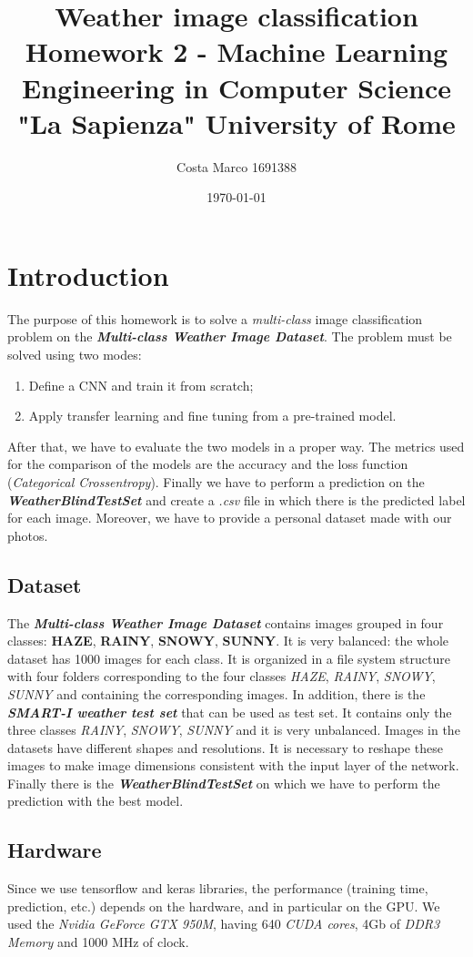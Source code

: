 \documentclass[11pt]{article}
\title{\textbf{Weather image classification} \\ \bigskip \large Homework 2 - Machine Learning \\ Engineering in Computer Science \\ "La Sapienza" University of Rome}
\author{Costa Marco 1691388}
\date{\today}
\begin{document}
\maketitle
\pagebreak
\tableofcontents
\pagebreak

\section{Introduction}
The purpose of this homework is to solve a \textit{multi-class} image classification problem on the \textbf{\textit{Multi-class Weather Image Dataset}}. The problem must be solved using two modes:
\begin{enumerate}
	\item Define a CNN and train it from scratch;
	\item Apply transfer learning and fine tuning from a pre-trained model.
\end{enumerate}
After that, we have to evaluate the two models in a proper way. The metrics used for the comparison of the models are the accuracy and the loss function (\textit{Categorical Crossentropy}).
Finally we have to perform a prediction on the \textbf{\textit{WeatherBlindTestSet}} and create a \textit{.csv} file in which there is the predicted label for each image.
Moreover, we have to provide a personal dataset made with our photos. 


\subsection{Dataset}
The \textbf{\textit{Multi-class Weather Image Dataset}} contains images grouped in four classes: \textbf{HAZE}, \textbf{RAINY}, \textbf{SNOWY}, \textbf{SUNNY}.
It is very balanced: the whole dataset has 1000 images for each class.
It is organized in a file system structure with four folders corresponding to the four classes \textit{HAZE}, \textit{RAINY}, \textit{SNOWY}, \textit{SUNNY} and containing the corresponding images.
In addition, there is the \textbf{\textit{SMART-I weather test set}} that can be used as test set. It contains only the three classes \textit{RAINY}, \textit{SNOWY}, \textit{SUNNY} and it is very unbalanced. 
Images in the datasets have different shapes and resolutions. It is necessary to reshape these images to make image dimensions consistent with the input layer of the network.
Finally there is the \textbf{\textit{WeatherBlindTestSet}} on which we have to perform the prediction with the best model.

\subsection{Hardware}
Since we use tensorflow and keras libraries, the performance (training time, prediction, etc.) depends on the hardware, and in particular on the GPU. We used the \textit{Nvidia GeForce GTX 950M}, having 640 \textit{CUDA cores}, 4Gb of \textit{DDR3 Memory} and 1000 MHz of clock.
\end{document}
